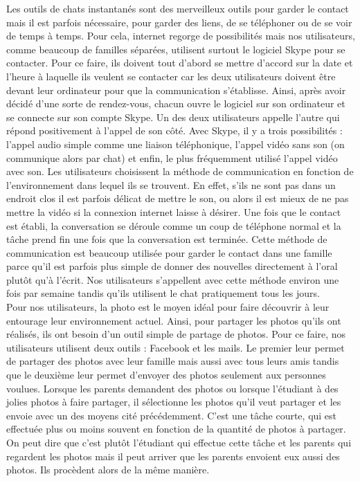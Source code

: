 \documentclass[12pt]{article}
\begin{document}
Les outils de chats instantanés sont des merveilleux outils pour garder le contact mais il est parfois nécessaire, pour garder des liens, de se téléphoner ou de se voir de temps à temps. Pour cela, internet regorge de possibilités mais nos utilisateurs, comme beaucoup de familles séparées, utilisent surtout le logiciel Skype pour se contacter. 
Pour ce faire, ils doivent tout d'abord se mettre d'accord sur la date et l'heure à laquelle ils veulent se contacter car les deux utilisateurs doivent être devant leur ordinateur pour que la communication s'établisse. Ainsi, après avoir décidé d'une sorte de rendez-vous, chacun ouvre le logiciel sur son ordinateur et se connecte sur son compte Skype. Un des deux utilisateurs appelle l'autre qui répond positivement à l'appel de son côté. Avec Skype, il y a trois possibilités :  l'appel audio simple comme une liaison téléphonique, l'appel vidéo sans son (on communique alors par chat) et enfin, le plus fréquemment utilisé l'appel vidéo avec son. Les utilisateurs choisissent la méthode de communication en fonction de l'environnement dans lequel ils se trouvent. En effet, s'ils ne sont pas dans un endroit clos il est parfois délicat de mettre le son, ou alors il est mieux de ne pas mettre la vidéo si la connexion internet laisse à désirer. Une fois que le contact est établi, la conversation se déroule comme un coup de téléphone normal et la tâche prend fin une fois que la conversation est terminée. Cette méthode de communication est beaucoup utilisée pour garder le contact dans une famille parce qu'il est parfois plus simple de donner des nouvelles directement à l'oral plutôt qu'à l'écrit. Nos utilisateurs s'appellent avec cette méthode environ une fois par semaine tandis qu'ils utilisent le chat pratiquement tous les jours.~\\

Pour nos utilisateurs, la photo est le moyen idéal pour faire découvrir à leur entourage leur environnement actuel. Ainsi, pour partager les photos qu'ils ont réalisés, ils ont besoin d'un outil simple de partage de photos. Pour ce faire, nos utilisateurs utilisent deux outils : Facebook et les mails. Le premier leur permet de partager des photos avec leur famille mais aussi avec tous leurs amis tandis que le deuxième leur permet d'envoyer des photos seulement aux personnes voulues. Lorsque les parents demandent des photos ou lorsque l'étudiant à des jolies photos à faire partager, il sélectionne les photos qu'il veut partager et les envoie avec un des moyens cité précédemment. C'est une tâche courte, qui est effectuée plus ou moins souvent en fonction de la quantité de photos à partager. On peut dire que c'est plutôt l'étudiant qui effectue cette tâche et les parents qui regardent les photos mais il peut arriver que les parents envoient eux aussi des photos. Ils procèdent alors de la même manière.~\\
\end{document}
